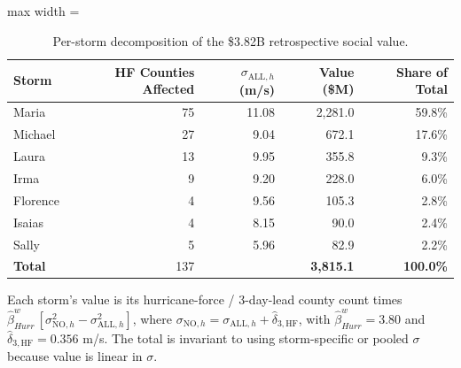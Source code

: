 \begin{table}

\caption{Per-storm decomposition of the \$3.82B retrospective social value. \label{tab:per_storm}}
\centering
\begin{adjustbox}{max width = \textwidth}
\begin{threeparttable}
\begin{tabular}[t]{lrrrr}
\toprule
Storm & HF Counties Affected & $\sigma_{\text{ALL},h}$ (m/s) & Value (\$M) & Share of Total\\
\midrule
Maria & 75 & 11.08 & 2,281.0 & 59.8\%\\
Michael & 27 & 9.04 & 672.1 & 17.6\%\\
Laura & 13 & 9.95 & 355.8 & 9.3\%\\
Irma & 9 & 9.20 & 228.0 & 6.0\%\\
Florence & 4 & 9.56 & 105.3 & 2.8\%\\
Isaias & 4 & 8.15 & 90.0 & 2.4\%\\
Sally & 5 & 5.96 & 82.9 & 2.2\%\\
\textbf{Total} & 137 &  & \textbf{3,815.1} & \textbf{100.0\%}\\
\bottomrule
\end{tabular}
\begin{tablenotes}
\small
\item Each storm's value is its hurricane-force / 3-day-lead county count times $\hat{\beta}^w_{Hurr}\,[\sigma_{\text{NO},h}^2-\sigma_{\text{ALL},h}^2]$, where $\sigma_{\text{NO},h}=\sigma_{\text{ALL},h}+\hat{\delta}_{3,\text{HF}}$, with $\hat{\beta}^w_{Hurr}=3.80$ and $\hat{\delta}_{3,\text{HF}}=0.356$ m/s. The total is invariant to using storm-specific or pooled $\sigma$ because value is linear in $\sigma$.
\end{tablenotes}
\end{threeparttable}
\end{adjustbox}
\end{table}

